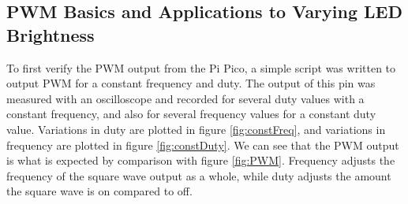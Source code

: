 \documentclass[%
 reprint,
 amsmath,amssymb,
 aps,
]{revtex4-2}
\begin{document}
    \subsection{PWM Basics and Applications to Varying LED Brightness}
    To first verify the PWM output from the Pi Pico, a simple script was written to output PWM for a constant frequency and duty. The output of this pin was measured with an oscilloscope and recorded for several duty values with a constant frequency, and also for several frequency values for a constant duty value. Variations in duty are plotted in figure \ref{fig:constFreq}, and variations in frequency are plotted in figure \ref{fig:constDuty}. We can see that the PWM output is what is expected by comparison with figure \ref{fig:PWM}. Frequency adjusts the frequency of the square wave output as a whole, while duty adjusts the amount the square wave is on compared to off.\\
\end{document}
